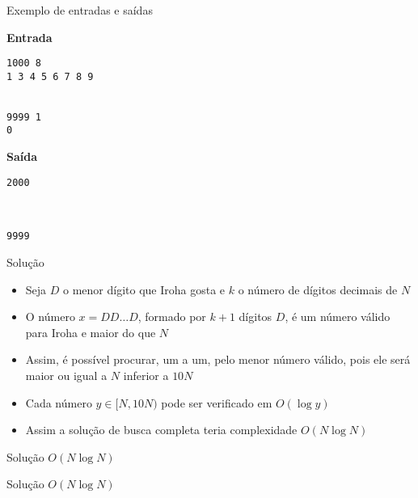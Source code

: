 \begin{frame}[fragile]{Exemplo de entradas e saídas}

\begin{minipage}[t]{0.45\textwidth}
\textbf{Entrada}
\begin{verbatim}
1000 8
1 3 4 5 6 7 8 9


9999 1
0
\end{verbatim}
\end{minipage}
\begin{minipage}[t]{0.5\textwidth}
\textbf{Saída}
\begin{verbatim}
2000



9999
\end{verbatim}
\end{minipage}
\end{frame}

\begin{frame}[fragile]{Solução}

    \begin{itemize}
        \item Seja $D$ o menor dígito que Iroha gosta e $k$ o número de dígitos decimais de $N$

        \item O número $x = DD\ldots D$, formado por $k + 1$ dígitos $D$, é um número válido para
            Iroha e maior do que $N$

        \item Assim, é possível procurar, um a um, pelo menor número válido, pois ele será maior 
            ou igual a $N$ inferior a $10N$

        \item Cada número $y \in [N, 10N)$ pode ser verificado em $O(\log y)$

        \item Assim a solução de busca completa teria complexidade $O(N\log N)$
    \end{itemize}

\end{frame}

\begin{frame}[fragile]{Solução $O(N\log N)$}
\end{frame}

\begin{frame}[fragile]{Solução $O(N\log N)$}
\end{frame}
